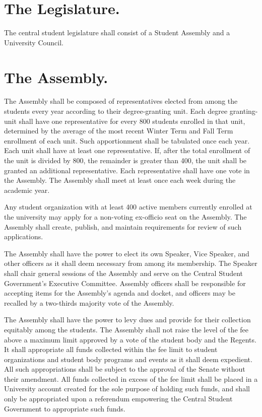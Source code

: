 \section{The Legislature.}
    The central student legislature shall consist of a Student Assembly and a University Council.

\section{The Assembly.}
    The Assembly shall be composed of representatives elected from among the students every year according to their degree-granting unit. Each degree granting-unit shall have one representative for every 800 students enrolled in that unit, determined by the average of the most recent Winter Term and Fall Term enrollment of each unit. Such apportionment shall be tabulated once each year. Each unit shall have at least one representative. If, after the total enrollment of the unit is divided by 800, the remainder is greater than 400, the unit shall be granted an additional representative. Each representative shall have one vote in the Assembly. The Assembly shall meet at least once each week during the academic year.

    Any student organization with at least 400 active members currently enrolled at the university may apply for a non-voting ex-officio seat on the Assembly. The Assembly shall create, publish, and maintain requirements for review of such applications.

    The Assembly shall have the power to elect its own Speaker, Vice Speaker, and other officers as it shall deem necessary from among its membership. The Speaker shall chair general sessions of the Assembly and serve on the Central Student Government's Executive Committee. Assembly officers shall be responsible for accepting items for the Assembly's agenda and docket, and officers may be recalled by a two-thirds majority vote of the Assembly.

     The Assembly shall have the power to levy dues and provide for their collection equitably among the students. The Assembly shall not raise the level of the fee above a maximum limit approved by a vote of the student body and the Regents. It shall appropriate all funds collected within the fee limit to student organizations and student body programs and events as it shall deem expedient. All such appropriations shall be subject to the approval of the Senate without their amendment. All funds collected in excess of the fee limit shall be placed in a University account created for the sole purpose of holding such funds, and shall only be appropriated upon a referendum empowering the Central Student Government to appropriate such funds.

